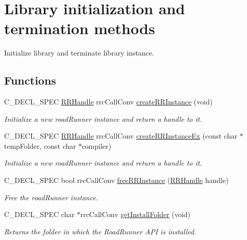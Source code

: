 \hypertarget{group__initialization}{}\section{Library initialization and termination methods}
\label{group__initialization}


Initialize library and terminate library instance.  


\subsection*{Functions}
\begin{DoxyCompactItemize}
\item 
C\+\_\+\+D\+E\+C\+L\+\_\+\+S\+P\+E\+C \hyperlink{rrc__types_8h_a1d68f0592372208fa5a5f2799ea4b3ae}{R\+R\+Handle} rrc\+Call\+Conv \hyperlink{group__initialization_ga3285113641ecf1dc35c39fceb39b60fc}{create\+R\+R\+Instance} (void)
\begin{DoxyCompactList}\small\item\em Initialize a new road\+Runner instance and return a handle to it. \end{DoxyCompactList}\item 
C\+\_\+\+D\+E\+C\+L\+\_\+\+S\+P\+E\+C \hyperlink{rrc__types_8h_a1d68f0592372208fa5a5f2799ea4b3ae}{R\+R\+Handle} rrc\+Call\+Conv \hyperlink{group__initialization_ga0bd8e459a637346cdf196f91148015ec}{create\+R\+R\+Instance\+Ex} (const char $\ast$temp\+Folder, const char $\ast$compiler)
\begin{DoxyCompactList}\small\item\em Initialize a new road\+Runner instance and return a handle to it. \end{DoxyCompactList}\item 
C\+\_\+\+D\+E\+C\+L\+\_\+\+S\+P\+E\+C bool rrc\+Call\+Conv \hyperlink{group__initialization_gae0b2f65464742bba3beb0ad38dcdd863}{free\+R\+R\+Instance} (\hyperlink{rrc__types_8h_a1d68f0592372208fa5a5f2799ea4b3ae}{R\+R\+Handle} handle)
\begin{DoxyCompactList}\small\item\em Free the road\+Runner instance. \end{DoxyCompactList}\item 
C\+\_\+\+D\+E\+C\+L\+\_\+\+S\+P\+E\+C char $\ast$rrc\+Call\+Conv \hyperlink{group__initialization_gaf2251f911a95afd0fafcac1e3c7bb40d}{get\+Install\+Folder} (void)
\begin{DoxyCompactList}\small\item\em Returns the folder in which the Road\+Runner A\+P\+I is installed. \end{DoxyCompactList}\item 

\end{DoxyCompactItemize}
